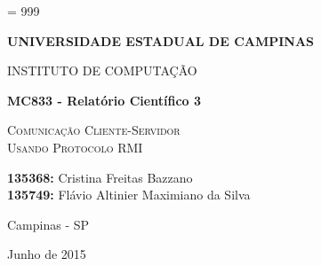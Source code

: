 \documentclass[12pt,a4paper]{article}
\begin{document}
\tolerance = 999
\sloppy


\thispagestyle{empty}

\begin{center}{\large \bf UNIVERSIDADE ESTADUAL DE CAMPINAS} \end{center}
\begin{center}{\large INSTITUTO DE COMPUTAÇÃO} \end{center}

\begin{center}
\begin{minipage}[tl]{31mm}
\end{minipage}
\end{center}

\vspace*{3.5cm}

\begin{center}
{\Large \bf MC833 - Relatório Científico 3}

\vspace*{2.0cm}

\textsc{\Large Comunicação Cliente-Servidor} \\ [0.1cm]
\textsc{\Large Usando Protocolo RMI}

\vspace{2.5cm}

\textbf{135368:} Cristina Freitas Bazzano \\
\textbf{135749:} Flávio Altinier Maximiano da Silva

\vspace{7.5cm}

{\large Campinas - SP}
\vspace*{0.2cm}

{\large Junho de 2015}
\end{center}

\clearpage

\onehalfspacing
\tableofcontents 
\clearpage
\onehalfspacing

\begin{abstract}
Este trabalho focou-se no estudo temporal de redes cliente-servidor baseadas em comunicação utilizando Java RMI. Foi implementado um serviço de locadora de filmes baseado em {\it MySQL} no servidor, e ao cliente foram adicionadas diversas operações de acesso ao banco, baseando-se em operações de consultas pequenas, grandes e de escrita. Observou-se que a escrita no banco é o processo mais lento, enquanto operações de consultas extensas são apenas brevemente mais lentas que buscas mais curtas. Comparamos os resultados de tempo desse processo utilizando RMI com os obtidos em um trabalho anterior baseado em TCP diretamente programado na linguagem C. Apesar de ser esperado que as operações em RMI fossem mais lentas, observamos exatamente o contrário; culpamos esse fato à melhor adaptação do MySQL ao Java do que ao C. Além disso, realizamos uma breve análise do tamanho de código e do nível de abstração.
\end{abstract}
\end{document}
